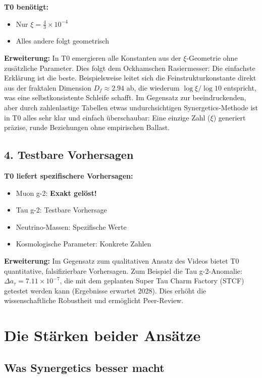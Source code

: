 \documentclass[12pt,a4paper]{article}
\newcommand{\xipar}{\xi}
\begin{document}
	\textbf{T0 benötigt:}
	\begin{itemize}
		\item Nur $\xipar = \frac{4}{3} \times 10^{-4}$
		\item Alles andere folgt geometrisch
	\end{itemize}
	
	\textbf{Erweiterung:} In T0 emergieren alle Konstanten aus der $\xipar$-Geometrie ohne zusätzliche Parameter. Dies folgt dem Ockhamschen Rasiermesser: Die einfachste Erklärung ist die beste. Beispielsweise leitet sich die Feinstrukturkonstante direkt aus der fraktalen Dimension $D_f \approx 2.94$ ab, die wiederum $\log \xipar / \log 10$ entspricht, was eine selbstkonsistente Schleife schafft. Im Gegensatz zur beeindruckenden, aber durch zahlenlastige Tabellen etwas undurchsichtigen Synergetics-Methode ist in T0 alles sehr klar und einfach überschaubar: Eine einzige Zahl ($\xipar$) generiert präzise, runde Beziehungen ohne empirischen Ballast.
	
	\subsection{4. Testbare Vorhersagen}
	
	\begin{vorteil}
		\textbf{T0 liefert spezifischere Vorhersagen:}
		\begin{itemize}
			\item Muon g-2: \textbf{Exakt gelöst!}
			\item Tau g-2: Testbare Vorhersage
			\item Neutrino-Massen: Spezifische Werte
			\item Kosmologische Parameter: Konkrete Zahlen
		\end{itemize}
		
		\textbf{Erweiterung:} Im Gegensatz zum qualitativen Ansatz des Videos bietet T0 quantitative, falsifizierbare Vorhersagen. Zum Beispiel die Tau g-2-Anomalie: $\Delta a_\tau = 7.11 \times 10^{-7}$, die mit dem geplanten Super Tau Charm Factory (STCF) getestet werden kann (Ergebnisse erwartet 2028). Dies erhöht die wissenschaftliche Robustheit und ermöglicht Peer-Review.
	\end{vorteil}
	
	\section{Die Stärken beider Ansätze}
	
	\subsection{Was Synergetics besser macht}
	
\end{document}
